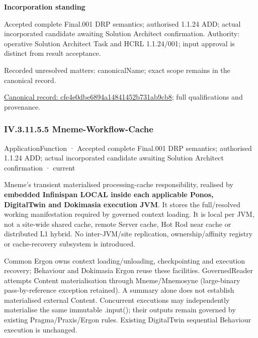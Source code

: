 \par\medskip\textbf{Incorporation standing}\par


Accepted complete Final.001 DRP semantics; authorised 1.1.24 ADD; actual incorporated candidate awaiting Solution Architect confirmation. Authority: operative Solution Architect Task and HCRL 1.1.24/001; input approval is distinct from result acceptance.


{\small Recorded unresolved matters: canonicalName; exact scope remains in the canonical record.}\par
{\footnotesize \href{../../../../../../../continuum/application/application-function/cfe4e0dbe6894a14841452b731ab9cb8.md}{Canonical record: cfe4e0dbe6894a14841452b731ab9cb8}; full qualifications and provenance.}\par
\subsubsection*{IV.3.11.5.5 Mneme-Workflow-Cache}
\label{navigation:IV.3.11.5.5}

\label{element:0bddade1309e426aa84d0cd97c35742a}
{\small ApplicationFunction · Accepted complete Final.001 DRP semantics; authorised 1.1.24 ADD; actual incorporated candidate awaiting Solution Architect confirmation · current}\par

Mneme's transient materialised processing-cache responsibility, realised by \textbf{embedded Infinispan LOCAL inside each applicable Ponos, DigitalTwin and Dokimasia execution JVM}. It stores the full/resolved working manifestation required by governed context loading. It is local per JVM, not a site-wide shared cache, remote Server cache, Hot Rod near cache or distributed L1 hybrid. No inter-JVM/site replication, ownership/affinity registry or cache-recovery subsystem is introduced.



Common Ergon owns context loading/unloading, checkpointing and execution recovery; Behaviour and Dokimasia Ergon reuse these facilities. GovernedReader attempts Content materialisation through Mneme/Mnemosyne (large-binary pass-by-reference exception retained). A summary alone does not establish materialised external Content. Concurrent executions may independently materialise the same immutable .input(); their outputs remain governed by existing Pragma/Praxis/Ergon rules. Existing DigitalTwin sequential Behaviour execution is unchanged.



